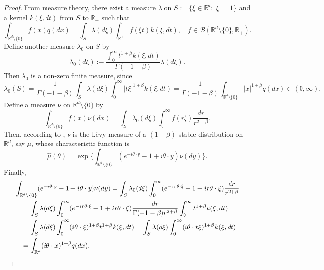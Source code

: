 \documentclass[12pt,a4paper]{amsart}
\theoremstyle{plain}
\theoremstyle{definition}
\numberwithin{equation}{section}
\begin{document}
\begin{proof}
    From measure theory, there exist a measure $\lambda$ on $S:= \{\xi\in \mathbb R^d:|\xi| = 1\}$ and a kernel $k(\xi,dt)$ from $S$ to $\mathbb R_+$ such that
\[
    \int_{\mathbb R^d\setminus \{0\}} f(x)q(dx) = \int_S \lambda(d\xi) \int_{\mathbb R^+} f(\xi t)k(\xi,dt),\quad
    f\in \mathcal B(\mathbb R^d\setminus \{0\}, \mathbb R_+).
\]
    Define another measure $\lambda_0$ on $S$ by
\[
    \lambda_0(d\xi) := \frac{\int_0^\infty t^{1+\beta}k(\xi,dt)}{\Gamma(-1-\beta)} \lambda (d\xi).
\]
    Then $\lambda_0$ is a non-zero finite measure, since
\[
    \lambda_0(S) = \frac{1}{\Gamma(-1-\beta)} \int_S \lambda (d\xi) \int_0^\infty |t\xi|^{1+\beta}k(\xi,dt)
    = \frac{1}{\Gamma(-1-\beta)} \int_{\mathbb R^d\setminus\{0\}} |x|^{1+\beta} q(dx) \in (0,\infty).
\]
    Define a measure $\nu$ on $\mathbb R^d\setminus\{0\}$ by
\[
    \int_{\mathbb R^d\setminus\{0\}}f(x)\nu(dx)= \int_{S} \lambda_0(d\xi) \int_0^\infty f(r\xi) \frac{dr}{r^{2+\beta}} .
\]
    Then, according to \cite[Remark 14.4]{Sato1999Levy}, $\nu$ is the L\`evy measure of a $(1+\beta)$-stable distribution on $\mathbb R^d$, say $\mu$, whose characteristic function is \[\hat \mu(\theta)=\exp\Big\{\int_{\mathbb R^d\setminus\{0\}} (e^{-i\theta \cdot y}-1+i\theta \cdot y) \nu(dy)\Big\}.\]
	Finally,
\begin{equation}\begin{split}
    &\int_{\mathbb R^d\setminus\{0\}} (e^{-i\theta \cdot y}-1+i\theta \cdot y) \nu(dy)
    = \int_S \lambda_0(d\xi) \int_0^\infty (e^{-ir\theta \cdot \xi}-1+ir\theta \cdot \xi) \frac{dr}{r^{2+\beta}}
\\&\quad = \int_S \lambda (d\xi) \int_0^\infty (e^{-ir\theta \cdot \xi}-1+ir\theta \cdot \xi) \frac{dr}{\Gamma(-1-\beta)r^{2+\beta}}\int_0^\infty t^{1+\beta} k(\xi,dt)
\\&\quad = \int_S \lambda (d\xi) \int_0^\infty (i\theta\cdot \xi)^{1+\beta} t^{1+\beta} k(\xi,dt)
= \int_S \lambda(d\xi) \int_0^\infty (i\theta \cdot t\xi)^{1+\beta} k(\xi,dt)
\\&\quad = \int_{\mathbb R^d} (i\theta \cdot x)^{1+\beta} q(dx).
\qedhere
\end{split}\end{equation}
\end{proof}
\end{document}
